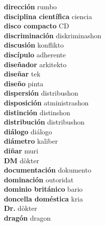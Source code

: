 \textbf{ dirección  } rumbo \\
\textbf{ disciplina científica  } ciencia \\
\textbf{ disco compacto  } CD \\
\textbf{ discriminación  } diskriminashon \\
\textbf{ discusión  } konflikto \\
\textbf{ discípulo  } adherente \\
\textbf{ diseñador  } arkitekto \\
\textbf{ diseñar  } tek \\
\textbf{ diseño  } pinta \\
\textbf{ dispersión  } distribushon \\
\textbf{ disposición  } atministrashon \\
\textbf{ distinción  } distinshon \\
\textbf{ distribución  } distribushon \\
\textbf{ diálogo  } diálogo \\
\textbf{ diámetro  } kaliber \\
\textbf{ diñar  } muri \\
\textbf{ DM  } dòkter \\
\textbf{ documentación  } dokumento \\
\textbf{ dominación  } outoridat \\
\textbf{ dominio británico  } bario \\
\textbf{ doncella doméstica  } kria \\
\textbf{ Dr.  } dòkter \\
\textbf{ dragón  } dragon \\
